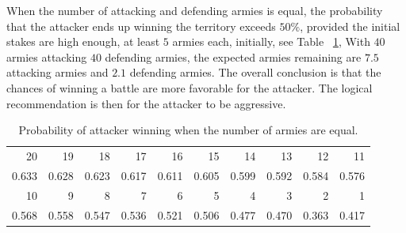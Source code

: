 \documentclass[12pt]{article}
\begin{document}
When the number of attacking and defending armies is equal, the
probability that the attacker ends up winning the territory exceeds \(
50\% \), provided the initial stakes are high enough, at least \( 5 \)
armies each, initially, see Table~%
\ref{tab:games:equalwins}, With \( 40 \) armies attacking \( 40 \)
defending armies, the expected armies remaining are \( 7.5 \) attacking
armies and \( 2.1 \) defending armies.  The overall conclusion is that
the chances of winning a battle are more favorable for the attacker.
The logical recommendation is then for the attacker to be aggressive.

\begin{table}
    \centering
    \begin{tabular}{rrrrrrrrrr}
        20     & 19       & 18          & 17          & 16          & 15      & 14         & 13    & 12    & 11    \\ 
        0.633  & 0.628    & 0.623       & 0.617       & 0.611       & 0.605   & 0.599      & 0.592 & 0.584 & 0.576 \\ 
        10     & 9        & 8           & 7           & 6           & 5       & 4          & 3     & 2     & 1     \\ 
        0.568  & 0.558    & 0.547       & 0.536       & 0.521       & 0.506   & 0.477      & 0.470 & 0.363 & 0.417
    \end{tabular}
    \caption{Probability of attacker winning when the number of armies
    are equal.}%
    \label{tab:games:equalwins}
\end{table}
\end{document}
